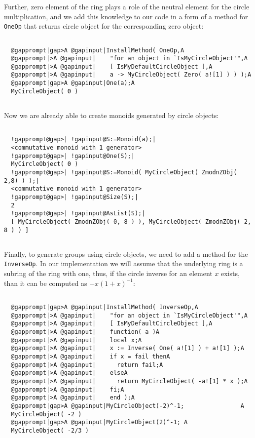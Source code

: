 \documentclass[a4paper,11pt]{report}
\begin{document}
{{\begin{Verbatim}[commandchars=@|A,fontsize=\small,frame=single,label=Example]
\end{Verbatim}
 Further, zero element of the ring plays a role of the neutral element for the
circle multiplication, and we add this knowledge to our code in a form of a
method for \texttt{OneOp} that returns circle object for the corresponding zero object: 
\begin{Verbatim}[commandchars=@|A,fontsize=\small,frame=single,label=Example]
  
  @gapprompt|gap>A @gapinput|InstallMethod( OneOp,A
  @gapprompt|>A @gapinput|    "for an object in `IsMyCircleObject'",A
  @gapprompt|>A @gapinput|    [ IsMyDefaultCircleObject ],A
  @gapprompt|>A @gapinput|    a -> MyCircleObject( Zero( a![1] ) ) );A
  @gapprompt|gap>A @gapinput|One(a);A
  MyCircleObject( 0 )
  
\end{Verbatim}
 Now we are already able to create monoids generated by circle objects: 
\begin{Verbatim}[commandchars=!@|,fontsize=\small,frame=single,label=Example]
  
  !gapprompt@gap>| !gapinput@S:=Monoid(a);|
  <commutative monoid with 1 generator>
  !gapprompt@gap>| !gapinput@One(S);|
  MyCircleObject( 0 )
  !gapprompt@gap>| !gapinput@S:=Monoid( MyCircleObject( ZmodnZObj( 2,8) ) );|
  <commutative monoid with 1 generator>
  !gapprompt@gap>| !gapinput@Size(S);|
  2
  !gapprompt@gap>| !gapinput@AsList(S);|
  [ MyCircleObject( ZmodnZObj( 0, 8 ) ), MyCircleObject( ZmodnZObj( 2, 8 ) ) ]
  
\end{Verbatim}
 Finally, to generate groups using circle objects, we need to add a method for
the \texttt{InverseOp}. In our implementation we will assume that the underlying ring is a subring
of the ring with one, thus, if the circle inverse for an element $x$ exists, than it can be computed as $-x(1+x)^{-1}$: 
\begin{Verbatim}[commandchars=@|A,fontsize=\small,frame=single,label=Example]
  
  @gapprompt|gap>A @gapinput|InstallMethod( InverseOp,A
  @gapprompt|>A @gapinput|    "for an object in `IsMyCircleObject'",A
  @gapprompt|>A @gapinput|    [ IsMyDefaultCircleObject ],A
  @gapprompt|>A @gapinput|    function( a )A
  @gapprompt|>A @gapinput|    local x;A
  @gapprompt|>A @gapinput|    x := Inverse( One( a![1] ) + a![1] );A
  @gapprompt|>A @gapinput|    if x = fail thenA
  @gapprompt|>A @gapinput|      return fail;A
  @gapprompt|>A @gapinput|    elseA
  @gapprompt|>A @gapinput|      return MyCircleObject( -a![1] * x );A
  @gapprompt|>A @gapinput|    fi;A
  @gapprompt|>A @gapinput|    end );A
  @gapprompt|gap>A @gapinput|MyCircleObject(-2)^-1;                A
  MyCircleObject( -2 )
  @gapprompt|gap>A @gapinput|MyCircleObject(2)^-1; A
  MyCircleObject( -2/3 )
  

\end{Verbatim}}}
\end{document}
